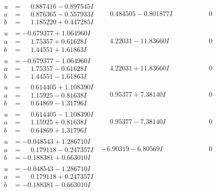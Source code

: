 \documentclass[1p]{elsarticle_modified}
\theoremstyle{definition}
\begin{document}
$$\begin{array}{c|c|c}
\begin{aligned}
u &= \phantom{-}0.887416 - 0.897545 I \\
a &= \phantom{-}0.876365 - 0.557933 I \\
b &= \phantom{-}1.185220 + 0.447285 I\end{aligned}
 & \phantom{-}0.484505 - 0.801877 I & \phantom{-0.000000 } 0 \\ \hline\begin{aligned}
u &= -0.679377 + 1.064960 I \\
a &= \phantom{-}1.75357 + 0.61628 I \\
b &= \phantom{-}1.44551 + 1.61863 I\end{aligned}
 & \phantom{-}4.22031 - 11.83660 I & \phantom{-0.000000 } 0 \\ \hline\begin{aligned}
u &= -0.679377 - 1.064960 I \\
a &= \phantom{-}1.75357 - 0.61628 I \\
b &= \phantom{-}1.44551 - 1.61863 I\end{aligned}
 & \phantom{-}4.22031 + 11.83660 I & \phantom{-0.000000 } 0 \\ \hline\begin{aligned}
u &= \phantom{-}0.614405 + 1.108390 I \\
a &= \phantom{-}1.15925 - 0.81638 I \\
b &= \phantom{-}0.64869 - 1.31796 I\end{aligned}
 & \phantom{-}0.95377 + 7.38140 I & \phantom{-0.000000 } 0 \\ \hline\begin{aligned}
u &= \phantom{-}0.614405 - 1.108390 I \\
a &= \phantom{-}1.15925 + 0.81638 I \\
b &= \phantom{-}0.64869 + 1.31796 I\end{aligned}
 & \phantom{-}0.95377 - 7.38140 I & \phantom{-0.000000 } 0 \\ \hline\begin{aligned}
u &= -0.048543 + 1.286710 I \\
a &= \phantom{-}0.179118 - 0.247357 I \\
b &= -0.188381 + 0.663010 I\end{aligned}
 & -6.90319 - 6.80569 I & \phantom{-0.000000 } 0 \\ \hline\begin{aligned}
u &= -0.048543 - 1.286710 I \\
a &= \phantom{-}0.179118 + 0.247357 I \\
b &= -0.188381 - 0.663010 I\end{aligned}

\end{array}$$
\end{document}
